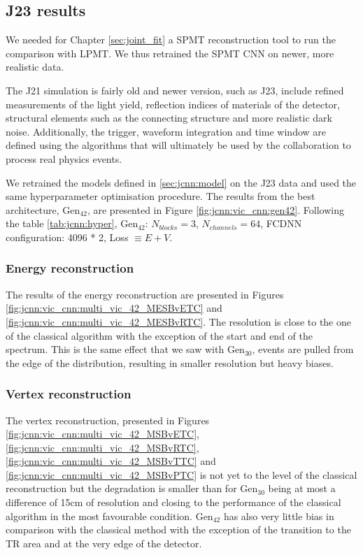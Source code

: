 \documentclass[../main.tex]{subfiles}
\begin{document}
{{\subsection{J23 results}

We needed for Chapter \ref{sec:joint_fit} a SPMT reconstruction tool to run the comparison with LPMT. We thus retrained the SPMT CNN on newer, more realistic data.

The J21 simulation is fairly old and newer version, such as J23, include refined measurements of the light yield, reflection indices of materials of the detector, structural elements such as the connecting structure and more realistic dark noise. Additionally, the trigger, waveform integration and time window are defined using the algorithms that will ultimately be used by the collaboration to process real physics events.

We retrained the models defined in \ref{sec:jcnn:model} on the J23 data and used the same hyperparameter optimisation procedure. The results from the best architecture, $\mathrm{Gen}_{42}$, are presented in Figure \ref{fig:jcnn:vic_cnn:gen42}. Following the table \ref{tab:jcnn:hyper}, $\mathrm{Gen}_{42}$: $N_{blocks} = 3$, $N_{channels} = 64$, FCDNN configuration: 4096 * 2, Loss $\equiv E+V$.

\subsubsection{Energy reconstruction}

The results of the energy reconstruction are presented in Figures \ref{fig:jcnn:vic_cnn:multi_vic_42_MESBvETC} and \ref{fig:jcnn:vic_cnn:multi_vic_42_MESBvRTC}. The resolution is close to the one of the classical algorithm with the exception of the start and end of the spectrum. This is the same effect that we saw with $\mathrm{Gen}_{30}$, events are pulled from the edge of the distribution, resulting in smaller resolution but heavy biases.

\subsubsection{Vertex reconstruction}

The vertex reconstruction, presented in Figures \ref{fig:jcnn:vic_cnn:multi_vic_42_MSBvETC}, \ref{fig:jcnn:vic_cnn:multi_vic_42_MSBvRTC}, \ref{fig:jcnn:vic_cnn:multi_vic_42_MSBvTTC} and \ref{fig:jcnn:vic_cnn:multi_vic_42_MSBvPTC} is not yet to the level of the classical reconstruction but the degradation is smaller than for $\mathrm{Gen}_{30}$ being at most a difference of 15cm of resolution and closing to the performance of the classical algorithm in the most favourable condition. $\mathrm{Gen}_{42}$ has also very little bias in comparison with the classical method with the exception of the transition to the TR area and at the very edge of the detector.

}}
\end{document}
